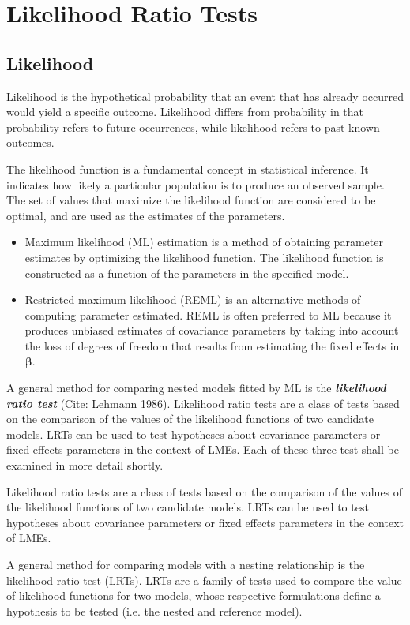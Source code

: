 \documentclass[12pt, a4paper]{report}
\theoremstyle{plain}
\theoremstyle{definition}
\theoremstyle{remark}
\begin{document}
\chapter{Likelihood Ratio Tests}
\section{Likelihood}
Likelihood is the hypothetical probability that an event that has
already occurred would yield a specific outcome. Likelihood
differs from probability in that probability refers to future
occurrences, while likelihood refers to past known outcomes.

The likelihood function is a fundamental concept in statistical inference. It indicates how likely a particular population is to produce an observed sample. The set of values that maximize the likelihood function are considered to be optimal, and are used as the estimates of the parameters.

\begin{itemize}
	\item Maximum likelihood (ML) estimation is a method of obtaining
	parameter estimates by optimizing the likelihood function. The likelihood function is constructed as a function of the parameters in the specified model.
	
	\item Restricted maximum likelihood (REML) is an alternative methods of
	computing parameter estimated. REML is often preferred to ML because it produces unbiased estimates of covariance parameters by taking into account the loss of degrees of freedom that results
	from estimating the fixed effects in $\boldsymbol{\beta}$.
\end{itemize}
A general method for comparing nested models fitted by ML is the \textbf{\emph{likelihood ratio test}} (Cite: Lehmann 1986).  Likelihood ratio tests are a class of tests based on the comparison of the values of the likelihood functions of two candidate models. LRTs can be used to test hypotheses about covariance parameters or fixed effects parameters in the context of LMEs.  Each of these three test shall be examined in more detail shortly.

Likelihood ratio tests are a class of tests based on the
comparison of the values of the likelihood functions of two
candidate models. LRTs can be used to test hypotheses about
covariance parameters or fixed effects parameters in the context
of LMEs.

A general method for comparing models with a nesting relationship is the likelihood ratio test (LRTs). LRTs are a family of tests used to compare the value of likelihood functions for two models, whose respective formulations define a hypothesis to be tested (i.e. the nested and reference model). 
\end{document}
